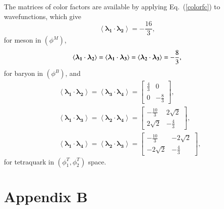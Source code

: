 \documentclass[12pt,onecolumn,floatfix,nofootinbib]{revtex4}
\begin{document}
The matrices of color factors are available by applying Eq.~(\ref{colorfc})
to wavefunctions, which give
\begin{equation}  \label{cfcM}
\left\langle \boldsymbol{\lambda_{1}}\cdot \boldsymbol{\lambda_{2}}
\right\rangle=-\frac{16}{3},
\end{equation}
for meson in $(\phi^{M})$,
\begin{equation}  \label{cfcB}
\left\langle \boldsymbol{\lambda_{1}}\cdot \boldsymbol{\lambda_{2}}
\right\rangle= \left\langle \boldsymbol{\lambda_{1}}\cdot \boldsymbol{%
\lambda_{3}} \right\rangle= \left\langle \boldsymbol{\lambda_{2}}\cdot
\boldsymbol{\lambda_{3}} \right\rangle=-\frac{8}{3},
\end{equation}
for baryon in $(\phi^{B})$, and
\begin{equation}  \label{cfcT}
\begin{aligned} &\left\langle \boldsymbol{\lambda_{1}}\cdot
\boldsymbol{\lambda_{2}} \right\rangle= \left\langle
\boldsymbol{\lambda_{3}}\cdot \boldsymbol{\lambda_{4}} \right\rangle=
\begin{bmatrix} \frac{4}{3} & 0 \\ 0 & -\frac{8}{3} \end{bmatrix}, \\
&\left\langle \boldsymbol{\lambda_{1}}\cdot \boldsymbol{\lambda_{3}}
\right\rangle= \left\langle \boldsymbol{\lambda_{2}}\cdot
\boldsymbol{\lambda_{4}} \right\rangle= \begin{bmatrix} -\frac{10}{3} &
2\sqrt{2} \\ 2\sqrt{2} & -\frac{4}{3} \end{bmatrix}, \\ &\left\langle
\boldsymbol{\lambda_{1}}\cdot \boldsymbol{\lambda_{4}} \right\rangle=
\left\langle \boldsymbol{\lambda_{2}}\cdot \boldsymbol{\lambda_{3}}
\right\rangle= \begin{bmatrix} -\frac{10}{3} & -2\sqrt{2} \\ -2\sqrt{2} &
-\frac{4}{3} \end{bmatrix}, \end{aligned}
\end{equation}
for tetraquark in $(\phi_{1}^{T},\phi_{2}^{T})$ space.

\medskip

\section*{Appendix B}
\end{document}
